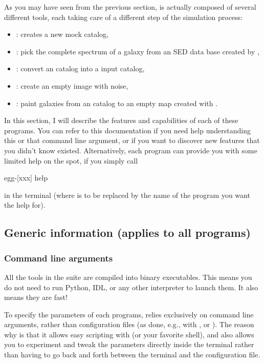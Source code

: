 As you may have seen from the previous section, \egg is actually composed of several different tools, each taking care of a different step of the simulation process:
\begin{itemize}
\item {}: creates a new \egg mock catalog,
\item {}: pick the complete spectrum of a galaxy from an SED data base created by ,
\item {}: convert an \egg catalog into a \skymaker input catalog,
\item {}: create an empty image with noise,
\item {}: paint galaxies from an \egg catalog to an empty map created with .
\end{itemize}

In this section, I will describe the features and capabilities of each of these programs. You can refer to this documentation if you need help understanding this or that command line argument, or if you want to discover new features that you didn't know existed. Alternatively, each program can provide you with some limited help on the spot, if you simply call
\begin{bashcode}
egg-[xxx] help
\end{bashcode}
in the terminal (where \bashinline{[xxx]} is to be replaced by the name of the program you want the help for).

\subsection{Generic information (applies to all programs)}

\subsubsection{Command line arguments}

All the tools in the \egg suite are compiled into binary executables. This means you do not need to run Python, IDL, or any other interpreter to launch them. It also means they are fast!

To specify the parameters of each programs, \egg relies exclusively on command line arguments, rather than configuration files (as done, e.g., with \tphot, \skymaker or \sextractor). The reason why is that it allows easy scripting with \bash (or your favorite shell), and also allows you to experiment and tweak the parameters directly inside the terminal rather than having to go back and forth between the terminal and the configuration file.

